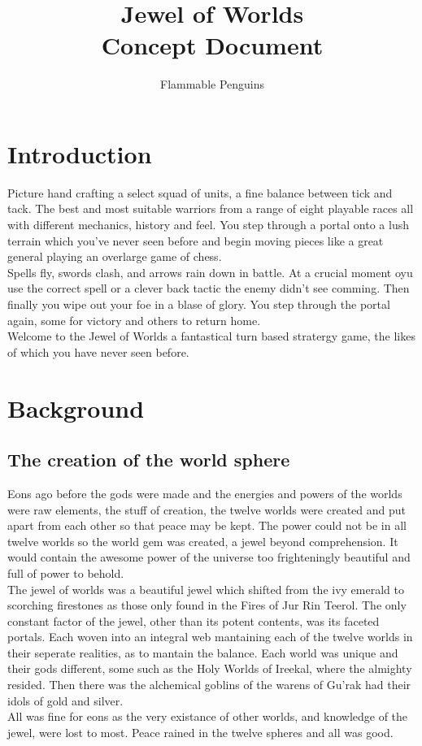 \documentclass[a4paper]{article}
\author{Flammable Penguins}
\title{\textbf{Jewel of Worlds} \\ Concept Document}
\begin{document}
\newcommand{\TinySection}[1]{\begin{flushright} \textbf{#1} \end{flushright}}

\maketitle

\tableofcontents

\newpage \section{Introduction}
Picture hand crafting a select squad of units, a fine balance between tick and tack. The best and most suitable warriors from a range of eight playable races all with different mechanics, history and feel. You step through a portal onto a lush terrain which you've never seen before and begin moving pieces like a great general playing an overlarge game of chess.\\
Spells fly, swords clash, and arrows rain down in battle. At a crucial moment oyu use the correct spell or a clever back tactic the enemy didn't see comming. Then finally you wipe out your foe in a blase of glory. You step through the portal again, some for victory and others to return home.\\
Welcome to the Jewel of Worlds a fantastical turn based stratergy game, the likes of which you have never seen before.

\newpage \section{Background}

\subsection{The creation of the world sphere}

Eons ago before the gods were made and the energies and powers of the worlds were raw elements, the stuff of creation, the twelve worlds were created and put apart from each other so that peace may be kept. The power could not be in all twelve worlds so the world gem was created, a jewel beyond comprehension. It would contain the awesome power of the universe too frighteningly beautiful and full of power to behold. \\
The jewel of worlds was a beautiful jewel which shifted from the ivy emerald to scorching firestones as those only found in the Fires of Jur Rin Teerol. The only constant factor of the jewel, other than its potent contents, was its faceted portals. Each woven into an integral web mantaining each of the twelve worlds in their seperate realities, as to mantain the balance. Each world was unique and their gods different, some such as the Holy Worlds of Ireekal, where the almighty resided. Then there was the alchemical goblins of the warens of Gu'rak had their idols of gold and silver.\\
All was fine for eons as the very existance of other worlds, and knowledge of the jewel, were lost to most. Peace rained in the twelve spheres and all was good.
\end{document}

